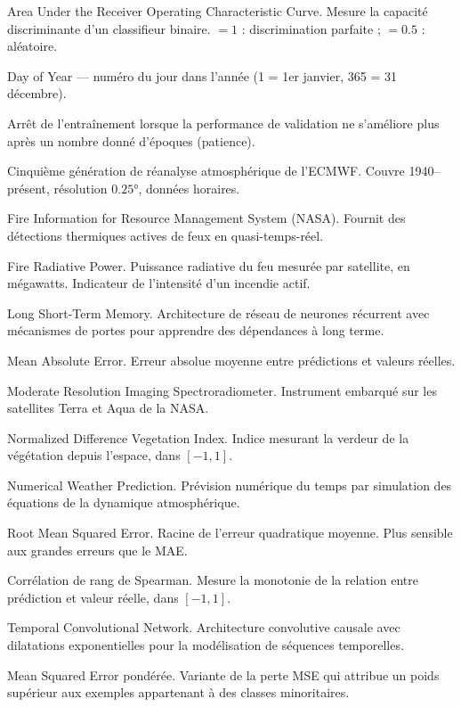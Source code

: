 \documentclass[12pt,a4paper]{report}
\begin{document}
\begin{description}[leftmargin=*,style=nextline]
  \item[\textbf{AUC-ROC}] Area Under the Receiver Operating Characteristic Curve.
    Mesure la capacité discriminante d'un classifieur binaire. $= 1$ : discrimination parfaite ;
    $= 0.5$ : aléatoire.
  \item[\textbf{DOY}] Day of Year — numéro du jour dans l'année (1 = 1er janvier, 365 = 31 décembre).
  \item[\textbf{Early Stopping}] Arrêt de l'entraînement lorsque la performance de
    validation ne s'améliore plus après un nombre donné d'époques (patience).
  \item[\textbf{ERA5}] Cinquième génération de réanalyse atmosphérique de l'ECMWF.
    Couvre 1940–présent, résolution $0.25°$, données horaires.
  \item[\textbf{FIRMS}] Fire Information for Resource Management System (NASA).
    Fournit des détections thermiques actives de feux en quasi-temps-réel.
  \item[\textbf{FRP}] Fire Radiative Power. Puissance radiative du feu mesurée par
    satellite, en mégawatts. Indicateur de l'intensité d'un incendie actif.
  \item[\textbf{LSTM}] Long Short-Term Memory. Architecture de réseau de neurones
    récurrent avec mécanismes de portes pour apprendre des dépendances à long terme.
  \item[\textbf{MAE}] Mean Absolute Error. Erreur absolue moyenne entre prédictions
    et valeurs réelles.
  \item[\textbf{MODIS}] Moderate Resolution Imaging Spectroradiometer. Instrument
    embarqué sur les satellites Terra et Aqua de la NASA.
  \item[\textbf{NDVI}] Normalized Difference Vegetation Index. Indice mesurant la
    verdeur de la végétation depuis l'espace, dans $[-1, 1]$.
  \item[\textbf{NWP}] Numerical Weather Prediction. Prévision numérique du temps par
    simulation des équations de la dynamique atmosphérique.
  \item[\textbf{RMSE}] Root Mean Squared Error. Racine de l'erreur quadratique moyenne.
    Plus sensible aux grandes erreurs que le MAE.
  \item[\textbf{Spearman $\rho$}] Corrélation de rang de Spearman. Mesure la monotonie
    de la relation entre prédiction et valeur réelle, dans $[-1, 1]$.
  \item[\textbf{TCN}] Temporal Convolutional Network. Architecture convolutive causale
    avec dilatations exponentielles pour la modélisation de séquences temporelles.
  \item[\textbf{Weighted MSE}] Mean Squared Error pondérée. Variante de la perte MSE
    qui attribue un poids supérieur aux exemples appartenant à des classes minoritaires.
\end{description}
\end{document}
